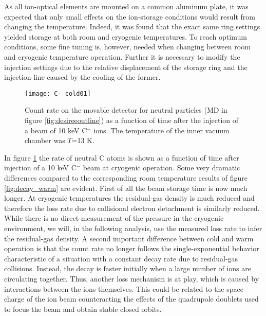 \documentclass[aps,pra,preprint,superscriptaddress]{revtex4}
\begin{document}
As all ion-optical elements are mounted on a common aluminum plate, it was expected that only small effects on the ion-storage conditions would result from changing the temperature. Indeed, it was found that the exact same ring settings yielded storage at both room and cryogenic temperatures. To reach optimum conditions, some fine tuning is, however, needed when changing between room and cryogenic temperature operation. Further it is necessary to modify the injection settings due to the relative displacement of the storage ring and the injection line caused by the cooling of the former.
\begin{figure}
	\centering
		\texttt{[image: C-\_cold01]}
	\caption{Count rate on the movable detector for neutral particles (MD in figure \ref{fig:desireeoutline}) as a function of time after the injection of a beam of 10 keV C$^-$ ions. The temperature of the inner vacuum chamber was $T$=13 K.}
	\label{fig:C-_cold01}
\end{figure}
In figure \ref{fig:C-_cold01} the rate of neutral C atoms is shown as a function of time after injection of a 10 keV C$^-$ beam at cryogenic operation. Some very dramatic differences compared to the corresponding room temperature results of figure \ref{fig:decay_warm} are evident. First of all the beam storage time is now much longer. At cryogenic temperatures the residual-gas density is much reduced and therefore the loss rate due to collisional electron detachment is similarly reduced. While there is no direct measurement of the pressure in the cryogenic environment, we will, in the following analysis, use the measured loss rate to infer the residual-gas density. A second important difference between cold and warm operation is that the count rate no longer follows the single-exponential behavior characteristic of a situation with a constant decay rate due to residual-gas collisions. Instead, the decay is faster initially when a large number of ions are circulating together. Thus, another loss mechanism is at play, which is caused by interactions between the ions themselves. This could be related to the space-charge of the ion beam counteracting the effects of the quadrupole doublets used to focus the beam and obtain stable closed orbits. 
\end{document}
